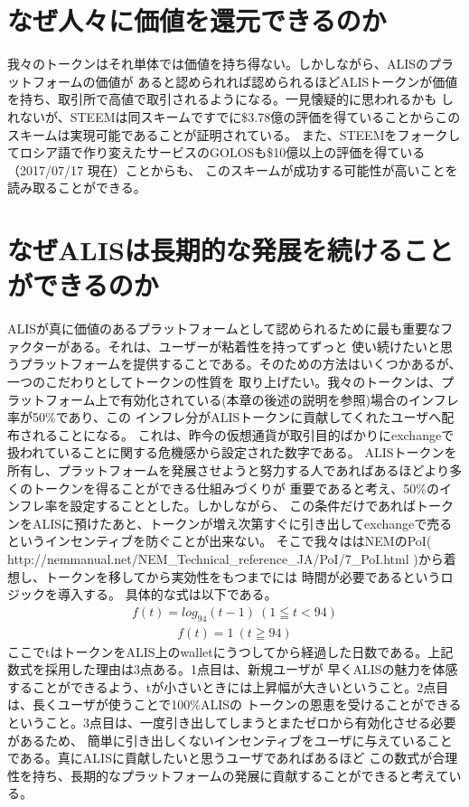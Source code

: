 \documentclass{jsarticle}
\begin{document}
\section{なぜ人々に価値を還元できるのか}
我々のトークンはそれ単体では価値を持ち得ない。しかしながら、ALISのプラットフォームの価値が
あると認められれば認められるほどALISトークンが価値を持ち、取引所で高値で取引されるようになる。一見懐疑的に思われるかも
しれないが、STEEMは同スキームですでに\$3.78億の評価を得ていることからこのスキームは実現可能であることが証明されている。
また、STEEMをフォークしてロシア語で作り変えたサービスのGOLOSも\$10億以上の評価を得ている（2017/07/17 現在）ことからも、
このスキームが成功する可能性が高いことを読み取ることができる。
\section{なぜALISは長期的な発展を続けることができるのか}
ALISが真に価値のあるプラットフォームとして認められるために最も重要なファクターがある。それは、ユーザーが粘着性を持ってずっと
使い続けたいと思うプラットフォームを提供することである。そのための方法はいくつかあるが、一つのこだわりとしてトークンの性質を
取り上げたい。我々のトークンは、プラットフォーム上で有効化されている(本章の後述の説明を参照)場合のインフレ率が50\%であり、この
インフレ分がALISトークンに貢献してくれたユーザへ配布されることになる。
これは、昨今の仮想通貨が取引目的ばかりにexchangeで扱われていることに関する危機感から設定された数字である。
ALISトークンを所有し、プラットフォームを発展させようと努力する人であればあるほどより多くのトークンを得ることができる仕組みづくりが
重要であると考え、50\%のインフレ率を設定することとした。しかしながら、
この条件だけであればトークンをALISに預けたあと、トークンが増え次第すぐに引き出してexchangeで売るというインセンティブを防ぐことが出来ない。
そこで我々ははNEMのPoI( http://nemmanual.net/NEM\_Technical\_reference\_JA/PoI/7\_PoI.html )から着想し、トークンを移してから実効性をもつまでには
時間が必要であるというロジックを導入する。
具体的な式は以下である。
\begin{align}
f(t) = log_{94}(t-1)\:(1 ≦ t < 94)
\end{align}
\begin{align}
f(t) = 1\:(t ≧ 94)
\end{align}
ここでtはトークンをALIS上のwalletにうつしてから経過した日数である。上記数式を採用した理由は3点ある。1点目は、新規ユーザが
早くALISの魅力を体感することができるよう、tが小さいときには上昇幅が大きいということ。2点目は、長くユーザが使うことで100\%ALISの
トークンの恩恵を受けることができるということ。3点目は、一度引き出してしまうとまたゼロから有効化させる必要があるため、
簡単に引き出しくないインセンティブをユーザに与えていることである。真にALISに貢献したいと思うユーザであればあるほど
この数式が合理性を持ち、長期的なプラットフォームの発展に貢献することができると考えている。
\end{document}
